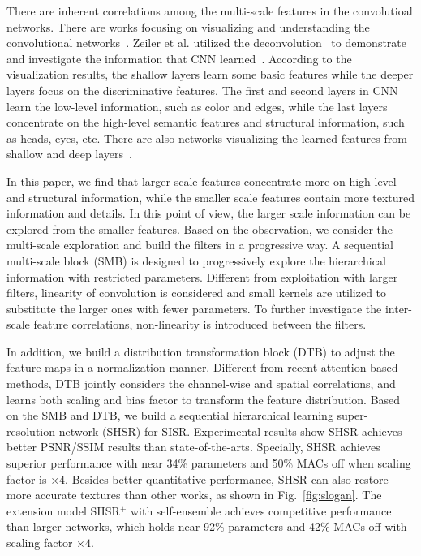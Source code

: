 \documentclass[manuscript,screen]{acmart}
\begin{document}
There are inherent correlations among the multi-scale features in the convolutioal networks. There are works focusing on visualizing and understanding the convolutional networks~\cite{review2_1, reviewer2_2}. Zeiler et al. utilized the deconvolution~\cite{review2_1} to demonstrate and investigate the information that CNN learned~\cite{reviewer2_2}. According to the visualization results, the shallow layers learn some basic features while the deeper layers focus on the discriminative features. The first and second layers in CNN learn the low-level information, such as color and edges, while the last layers concentrate on the high-level semantic features and structural information, such as heads, eyes, etc. There are also networks visualizing the learned features from shallow and deep layers~\cite{reviewer2_3, review2_4}.

In this paper, we find that larger scale features concentrate more on high-level and structural information, while the smaller scale features contain more textured information and details. In this point of view, the larger scale information can be explored from the smaller features. Based on the observation, we consider the multi-scale exploration and build the filters in a progressive way. A sequential multi-scale block (SMB) is designed to progressively explore the hierarchical information with restricted parameters. Different from exploitation with larger filters, linearity of convolution is considered and small kernels are utilized to substitute the larger ones with fewer parameters. To further investigate the inter-scale feature correlations, non-linearity is introduced between the filters. 

In addition, we build a distribution transformation block (DTB) to adjust the feature maps in a normalization manner. Different from recent attention-based methods, DTB jointly considers the channel-wise and spatial correlations, and learns both scaling and bias factor to transform the feature distribution. 
Based on the SMB and DTB, we build a sequential hierarchical learning super-resolution network (SHSR) for SISR. Experimental results show SHSR achieves better PSNR/SSIM results than state-of-the-arts. Specially, SHSR achieves superior performance with near 34\% parameters and 50\% MACs off when scaling factor is $\times4$. Besides better quantitative performance, SHSR can also restore more accurate textures than other works, as shown in Fig.~\ref{fig:slogan}. The extension model SHSR$^+$ with self-ensemble achieves competitive performance than larger networks, which holds near 92\% parameters and 42\% MACs off with scaling factor $\times4$.
\end{document}
